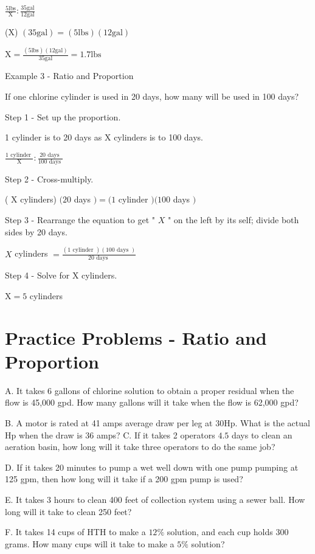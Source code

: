 $\frac{5 \mathrm{lbs}}{\mathrm{X}}: \frac{35 \mathrm{gal}}{12 \mathrm{gal}}$

(X) $(35 \mathrm{gal})=(5 \mathrm{lbs})(12 \mathrm{gal})$

$\mathrm{X}=\frac{(5 \mathrm{lbs})(12 \mathrm{gal})}{35 \mathrm{gal}}=1.7 \mathrm{lbs}$

Example 3 - Ratio and Proportion

If one chlorine cylinder is used in 20 days, how many will be used in 100 days?

Step 1 - Set up the proportion.

1 cylinder is to 20 days as $\mathrm{X}$ cylinders is to 100 days.

$\frac{1 \text { cylinder }}{\mathrm{X}}: \frac{20 \text { days }}{100 \text { days }}$

Step 2 - Cross-multiply.

( $\mathrm{X}$ cylinders) $(20$ days $)=(1$ cylinder $)(100$ days $)$

Step 3 - Rearrange the equation to get " $X$ " on the left by its self; divide both sides by 20 days.

$X$ cylinders $=\frac{(1 \text { cylinder })(100 \text { days })}{20 \text { days }}$

Step 4 - Solve for $\mathrm{X}$ cylinders.

$\mathrm{X}=5$ cylinders

\section{Practice Problems - Ratio and Proportion}
A. It takes 6 gallons of chlorine solution to obtain a proper residual when the flow is 45,000 gpd. How many gallons will it take when the flow is 62,000 gpd?

B. A motor is rated at 41 amps average draw per leg at $30 \mathrm{Hp}$. What is the actual $\mathrm{Hp}$ when the draw is 36 amps? C. If it takes 2 operators $4.5$ days to clean an aeration basin, how long will it take three operators to do the same job?

D. If it takes 20 minutes to pump a wet well down with one pump pumping at 125 gpm, then how long will it take if a 200 gpm pump is used?

E. It takes 3 hours to clean 400 feet of collection system using a sewer ball. How long will it take to clean 250 feet?

F. It takes 14 cups of $\mathrm{HTH}$ to make a $12 \%$ solution, and each cup holds 300 grams. How many cups will it take to make a $5 \%$ solution?

